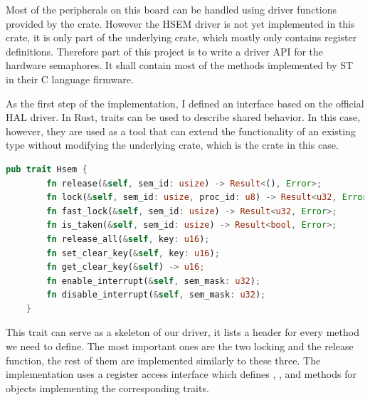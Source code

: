 Most of the peripherals on this board can be handled using driver functions provided by the  crate. However the HSEM driver is not yet implemented in this crate, it is only part of the underlying  crate, which mostly only contains register definitions. Therefore part of this project is to write a driver API for the hardware semaphores. It shall contain most of the methods implemented by ST in their C language firmware.\cite{HsemCCode}

As the first step of the implementation, I defined an interface based on the official HAL driver. In Rust, traits can be used to describe shared behavior. In this case, however, they are used as a tool that can extend the functionality of an existing type without modifying the underlying crate, which is the  crate in this case.

\begin{lstlisting}[language=Rust,frame=single,float=!ht,style=customrust,label={lst:hsem-trait-def},caption={HSEM Trait Definition},style=customrust]
    pub trait Hsem {
        fn release(&self, sem_id: usize) -> Result<(), Error>;
        fn lock(&self, sem_id: usize, proc_id: u8) -> Result<u32, Error>;
        fn fast_lock(&self, sem_id: usize) -> Result<u32, Error>;
        fn is_taken(&self, sem_id: usize) -> Result<bool, Error>;
        fn release_all(&self, key: u16);
        fn set_clear_key(&self, key: u16);
        fn get_clear_key(&self) -> u16;
        fn enable_interrupt(&self, sem_mask: u32);
        fn disable_interrupt(&self, sem_mask: u32);
    }
\end{lstlisting}

This trait can serve as a skeleton of our driver, it lists a header for every method we need to define. The most important ones are the two locking and the release function, the rest of them are implemented similarly to these three. The implementation uses a register access interface which defines , , and  methods for objects implementing the corresponding traits.

